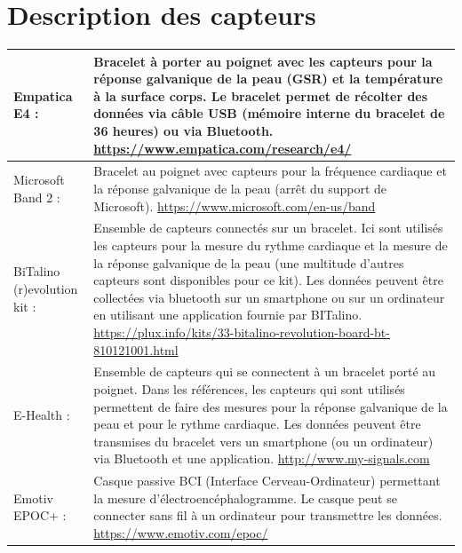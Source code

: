 \documentclass[11pt]{article}
\begin{document}
\newpage
\section{Description des capteurs}\label{ann:capteurs}
	\begin{longtable}{|p{5cm}|p{10cm}|}
		\hline
		Empatica E4 : & Bracelet à porter au poignet avec les capteurs pour la réponse galvanique de la peau (GSR) et la température à la surface corps.
		Le bracelet permet de récolter des données via câble USB (mémoire interne du bracelet de 36 heures) ou via Bluetooth.
		\newline \href{https://www.empatica.com/research/e4/}{https://www.empatica.com/research/e4/}\\\hline
		Microsoft Band 2 :& Bracelet au poignet avec capteurs pour la fréquence cardiaque et la réponse galvanique de la peau (arrêt du support de Microsoft).
		\newline \href{https://www.microsoft.com/en-us/band}{https://www.microsoft.com/en-us/band}\\\hline
		BiTalino (r)evolution kit :& Ensemble de capteurs connectés sur un bracelet.
		Ici sont utilisés les capteurs pour la mesure du rythme cardiaque et la mesure de la réponse galvanique de la peau (une multitude d'autres capteurs sont disponibles pour ce kit). 
		Les données peuvent être collectées via bluetooth sur un smartphone ou sur un ordinateur en utilisant une application fournie par BITalino.
		\newline \href{https://plux.info/kits/33-bitalino-revolution-board-bt-810121001.html}{https://plux.info/kits/33-bitalino-revolution-board-bt-810121001.html}\\\hline
		E-Health :& Ensemble de capteurs qui se connectent à un bracelet porté au poignet.
		Dans les références, les capteurs qui sont utilisés permettent de faire des mesures pour la réponse galvanique de la peau et pour le rythme cardiaque. 
		Les données peuvent être transmises du bracelet vers un smartphone (ou un ordinateur) via Bluetooth et une application.
		\newline \href{http://www.my-signals.com}{http://www.my-signals.com}\\\hline
		Emotiv EPOC+ :& Casque passive BCI (Interface Cerveau-Ordinateur) permettant la mesure d'électroencéphalogramme.
		Le casque peut se connecter sans fil à un ordinateur pour transmettre les données.
		\newline \href{https://www.emotiv.com/epoc/}{https://www.emotiv.com/epoc/}\\\hline

\end{longtable}
\end{document}

